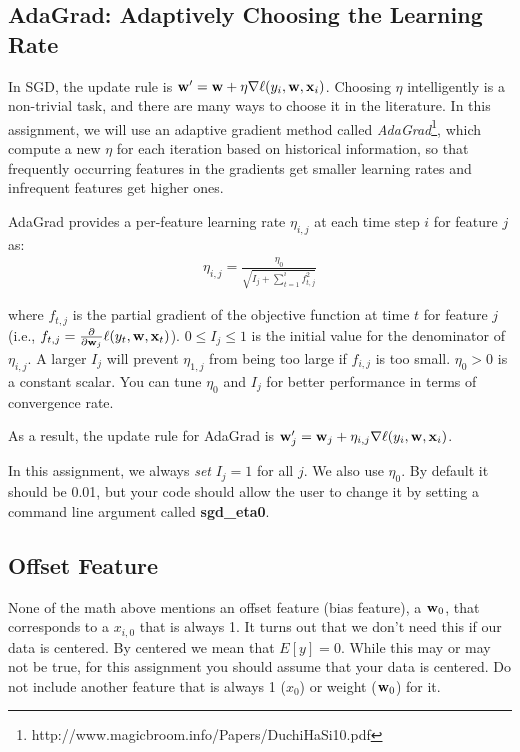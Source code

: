 \documentclass[11pt]{article}
\newcommand{\vw}{{\bf w}}
\newcommand{\vx}{{\bf x}}
\newcommand{\vxi}{{\bf x}_i}
\begin{document}
\subsection{AdaGrad: Adaptively Choosing the Learning Rate}
In SGD, the update rule is $\vw' = \vw + \eta \nabla \ell(y_i, \vw, \vxi)$. Choosing $\eta$ intelligently is a non-trivial task, and there are many ways to choose it in the literature. In this assignment, we will use an adaptive gradient method called \textit{AdaGrad}\footnote{http://www.magicbroom.info/Papers/DuchiHaSi10.pdf}, which compute a new $\eta$ for each iteration based on historical  information, so that frequently occurring features in the gradients get smaller learning rates and infrequent features get higher ones. 

AdaGrad provides a per-feature learning rate $\eta_{i,j}$ at each time step $i$ for feature $j$ as:
\begin{align}
\eta_{i,j}=\frac{\eta_0}{\sqrt{I_j+\sum_{t=1}^i f_{t,j}^2}}
\end{align}

where $f_{t,j}$ is the partial gradient of the objective function at time $t$ for feature $j$ (i.e., $f_{t,j}=\frac{\partial}{\partial \vw_j} \ell(y_t, \vw, \vx_t)$). $0 \le I_j \le 1$ is the initial value for the denominator of $\eta_{i,j}$. A larger $I_j$ will prevent $\eta_{1,j}$ from being too large if $f_{i,j}$ is too small. $\eta_0>0$ is a constant scalar.
You can tune $\eta_0$ and $I_j$ for better performance in terms of convergence rate. 

As a result, the update rule for AdaGrad is $\vw_j' = \vw_j + \eta_{i,j} \nabla \ell(y_i, \vw, \vxi)$.

In this assignment, we always \emph{set} $I_j=1$ for all $j$. We also use $\eta_0$. By default it should be 0.01, but your code should allow the user to change it by setting a command line argument called \textbf{sgd\_eta0}.



\subsection{Offset Feature}
None of the math above mentions an offset feature (bias feature), a $\vw_0$, that corresponds to a $x_{i,0}$ that is always 1. It turns out that we don't need this if our data is centered. By centered we mean that $E[y] = 0$. While this may or may not be true, for this assignment you should assume that your data is centered. Do not include another feature that is always 1 ($x_0$) or weight ($\vw_0$) for it.
\end{document}
